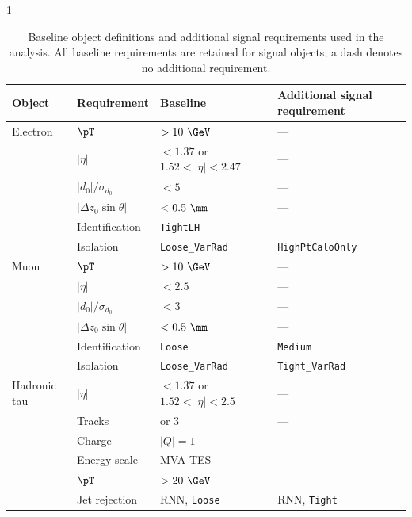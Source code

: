 \begin{table}[!htbp]
    \begin{spacing}{1}
    \centering
    \small
    \setlength{\tabcolsep}{4pt}
    \renewcommand{\arraystretch}{1.05}
    \caption[Baseline and signal object definitions]{Baseline object definitions and additional signal requirements used in the analysis. All baseline requirements are retained for signal objects; a dash denotes no additional requirement.}
    \label{tab:ch6_analysis_objects}
    \begin{tabular}{@{}>{\raggedright\arraybackslash}p{}>{\raggedright\arraybackslash}p{}>{\raggedright\arraybackslash}p{}>{\raggedright\arraybackslash}p{}@{}}
        \toprule
        Object & Requirement & Baseline & Additional signal requirement \\
        \midrule
        Electron & $\pT$ & $>10~\GeV$ & --- \\
        & $|\eta|$ & $<1.37$ or $1.52<|\eta|<2.47$ & --- \\
        & $|d_0|/\sigma_{d_0}$ & $<5$ & --- \\
        & $|\Delta z_0\sin\theta|$ & $<0.5~\mm$ & --- \\
        & Identification & \texttt{TightLH} & --- \\
        & Isolation & \texttt{Loose\_VarRad} & \texttt{HighPtCaloOnly} \\
        \midrule
        Muon & $\pT$ & $>10~\GeV$ & --- \\
        & $|\eta|$ & $<2.5$ & --- \\
        & $|d_0|/\sigma_{d_0}$ & $<3$ & --- \\
        & $|\Delta z_0\sin\theta|$ & $<0.5~\mm$ & --- \\
        & Identification & \texttt{Loose} & \texttt{Medium} \\
        & Isolation & \texttt{Loose\_VarRad} & \texttt{Tight\_VarRad} \\
        \midrule
        Hadronic tau & $|\eta|$ & $<1.37$ or $1.52<|\eta|<2.5$ & --- \\
        & Tracks & 1 or 3 & --- \\
        & Charge & $|Q|=1$ & --- \\
        & Energy scale & MVA TES & --- \\
        & $\pT$ & $>20~\GeV$ & --- \\
        & Jet rejection & RNN, \texttt{Loose} & RNN, \texttt{Tight} \\

\end{tabular}
\end{spacing}
\end{table}
